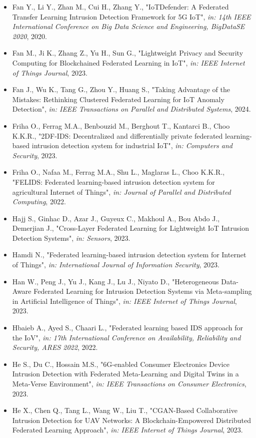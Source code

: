 \begin{itemize}
  \item Fan Y., Li Y., Zhan M., Cui H., Zhang Y., "IoTDefender: A Federated Transfer Learning Intrusion Detection Framework for 5G IoT", \textit{in: 14th IEEE International Conference on Big Data Science and Engineering, BigDataSE 2020}, 2020.
  \item Fan M., Ji K., Zhang Z., Yu H., Sun G., "Lightweight Privacy and Security Computing for Blockchained Federated Learning in IoT", \textit{in: IEEE Internet of Things Journal}, 2023.
  \item Fan J., Wu K., Tang G., Zhou Y., Huang S., "Taking Advantage of the Mistakes: Rethinking Clustered Federated Learning for IoT Anomaly Detection", \textit{in: IEEE Transactions on Parallel and Distributed Systems}, 2024.
  \item Friha O., Ferrag M.A., Benbouzid M., Berghout T., Kantarci B., Choo K.K.R., "2DF-IDS: Decentralized and differentially private federated learning-based intrusion detection system for industrial IoT", \textit{in: Computers and Security}, 2023.
  \item Friha O., Nafaa M., Ferrag M.A., Shu L., Maglaras L., Choo K.K.R., "FELIDS: Federated learning-based intrusion detection system for agricultural Internet of Things", \textit{in: Journal of Parallel and Distributed Computing}, 2022.
  \item Hajj S., Ginhac D., Azar J., Guyeux C., Makhoul A., Bou Abdo J., Demerjian J., "Cross-Layer Federated Learning for Lightweight IoT Intrusion Detection Systems", \textit{in: Sensors}, 2023.
  \item Hamdi N., "Federated learning-based intrusion detection system for Internet of Things", \textit{in: International Journal of Information Security}, 2023.
  \item Han W., Peng J., Yu J., Kang J., Lu J., Niyato D., "Heterogeneous Data-Aware Federated Learning for Intrusion Detection Systems via Meta-sampling in Artificial Intelligence of Things", \textit{in: IEEE Internet of Things Journal}, 2023.
  \item Hbaieb A., Ayed S., Chaari L., "Federated learning based IDS approach for the IoV", \textit{in: 17th International Conference on Availability, Reliability and Security, ARES 2022}, 2022.
  \item He S., Du C., Hossain M.S., "6G-enabled Consumer Electronics Device Intrusion Detection with Federated Meta-Learning and Digital Twins in a Meta-Verse Environment", \textit{in: IEEE Transactions on Consumer Electronics}, 2023.
  \item He X., Chen Q., Tang L., Wang W., Liu T., "CGAN-Based Collaborative Intrusion Detection for UAV Networks: A Blockchain-Empowered Distributed Federated Learning Approach", \textit{in: IEEE Internet of Things Journal}, 2023.

\end{itemize}
